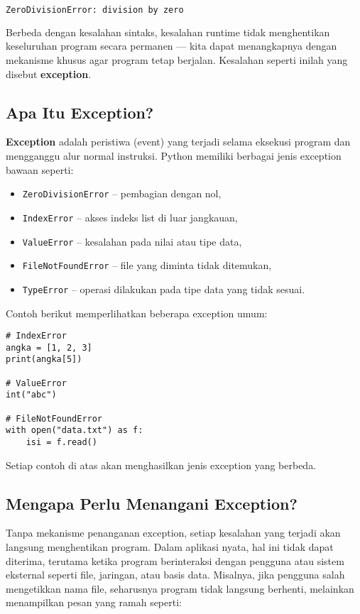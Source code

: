 \begin{lstlisting}[language=bash]
ZeroDivisionError: division by zero
\end{lstlisting}

Berbeda dengan kesalahan sintaks, kesalahan runtime tidak menghentikan keseluruhan program secara permanen — kita dapat menangkapnya dengan mekanisme khusus agar program tetap berjalan. Kesalahan seperti inilah yang disebut \textbf{exception}.

\subsection*{Apa Itu Exception?}

\textbf{Exception} adalah peristiwa (event) yang terjadi selama eksekusi program dan mengganggu alur normal instruksi. Python memiliki berbagai jenis exception bawaan seperti:

\begin{itemize}
    \item \texttt{ZeroDivisionError} – pembagian dengan nol,
    \item \texttt{IndexError} – akses indeks list di luar jangkauan,
    \item \texttt{ValueError} – kesalahan pada nilai atau tipe data,
    \item \texttt{FileNotFoundError} – file yang diminta tidak ditemukan,
    \item \texttt{TypeError} – operasi dilakukan pada tipe data yang tidak sesuai.
\end{itemize}

Contoh berikut memperlihatkan beberapa exception umum:

\begin{lstlisting}[style=PythonStyle, caption={Beberapa contoh exception umum}]
# IndexError
angka = [1, 2, 3]
print(angka[5])

# ValueError
int("abc")

# FileNotFoundError
with open("data.txt") as f:
    isi = f.read()
\end{lstlisting}

Setiap contoh di atas akan menghasilkan jenis exception yang berbeda.

\subsection*{Mengapa Perlu Menangani Exception?}

Tanpa mekanisme penanganan exception, setiap kesalahan yang terjadi akan langsung menghentikan program. Dalam aplikasi nyata, hal ini tidak dapat diterima, terutama ketika program berinteraksi dengan pengguna atau sistem eksternal seperti file, jaringan, atau basis data. Misalnya, jika pengguna salah mengetikkan nama file, seharusnya program tidak langsung berhenti, melainkan menampilkan pesan yang ramah seperti:

